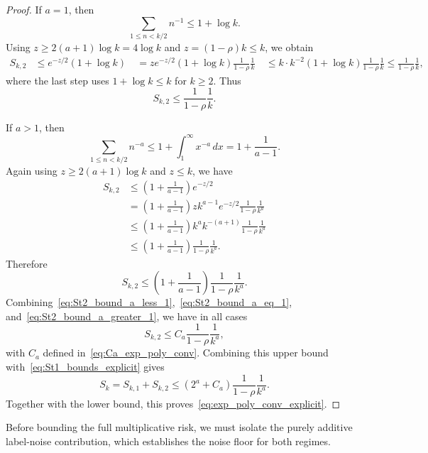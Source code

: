 \begin{proof}
If $a=1$, then
\[
    \sum_{1\le n<k/2}n^{-1}\le 1+\log k.
\]
Using $z\ge 2(a+1)\log k=4\log k$ and $z=(1-\rho)k\le k$, we obtain
\begin{align*}
    S_{k,2}
    &\le e^{-z/2}(1+\log k) \
    &= z e^{-z/2}(1+\log k)\frac{1}{1-\rho}\frac{1}{k} \
    &\le k\cdot k^{-2}(1+\log k)\frac{1}{1-\rho}\frac{1}{k}
    \le
    \frac{1}{1-\rho}\frac{1}{k},
\end{align*}
where the last step uses $1+\log k\le k$ for $k\ge2$. Thus
\begin{equation}
\label{eq:St2_bound_a_eq_1}
    S_{k,2}
    \le
    \frac{1}{1-\rho}\frac{1}{k}.
\end{equation}

If $a>1$, then
\[
    \sum_{1\le n<k/2}n^{-a}\le 1+\int_1^\infty x^{-a}\,dx
    =1+\frac{1}{a-1}.
\]
Again using $z\ge 2(a+1)\log k$ and $z\le k$, we have
\begin{align*}
    S_{k,2}
    &\le
    \left(1+\frac{1}{a-1}\right)e^{-z/2} \\
    &=
    \left(1+\frac{1}{a-1}\right)
    z k^{a-1}e^{-z/2}
    \frac{1}{1-\rho}\frac{1}{k^a} \\
    &\le
    \left(1+\frac{1}{a-1}\right)
    k^a k^{-(a+1)}
    \frac{1}{1-\rho}\frac{1}{k^a} \\
    &\le
    \left(1+\frac{1}{a-1}\right)
    \frac{1}{1-\rho}\frac{1}{k^a}.
\end{align*}
Therefore
\begin{equation}
\label{eq:St2_bound_a_greater_1}
    S_{k,2}
    \le
    \left(1+\frac{1}{a-1}\right)\frac{1}{1-\rho}\frac{1}{k^a}.
\end{equation}
Combining~\eqref{eq:St2_bound_a_less_1},~\eqref{eq:St2_bound_a_eq_1}, and~\eqref{eq:St2_bound_a_greater_1}, we have in all cases
\[
    S_{k,2}
    \le
    C_a\frac{1}{1-\rho}\frac{1}{k^a},
\]
with $C_a$ defined in~\eqref{eq:Ca_exp_poly_conv}. Combining this upper bound with~\eqref{eq:St1_bounds_explicit} gives
\[
    S_k=S_{k,1}+S_{k,2}
    \le
    (2^a+C_a)\frac{1}{1-\rho}\frac{1}{k^a}.
\]
Together with the lower bound, this proves~\eqref{eq:exp_poly_conv_explicit}.
\end{proof}

Before bounding the full multiplicative risk, we must isolate the purely additive label-noise contribution, which establishes the noise floor for both regimes.

